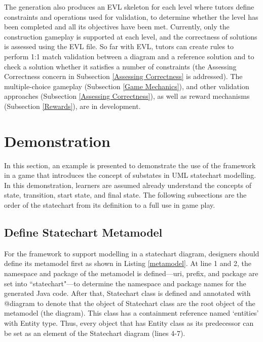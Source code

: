 \documentclass[conference]{IEEEtran}
\begin{document}
The generation also produces an EVL \cite{kolovos2006eclipse} skeleton for each level where tutors define constraints and operations used for validation, to determine whether the level has been completed and all its objectives have been met. Currently, only the construction gameplay is supported at each level, and the correctness of solutions is assessed using the EVL file. So far with EVL, tutors can create rules to perform 1:1 match validation between a diagram and a reference solution and to check a solution whether it satisfies a number of constraints (the Assessing Correctness concern in Subsection \ref{Assessing Correctness} is addressed). The multiple-choice gameplay (Subsection \ref{Game Mechanics}), and other validation approaches (Subsection \ref{Assessing Correctness}), as well as reward mechanisms (Subsection \ref{Rewards}), are in development. 


\section{Demonstration}
\label{Demonstration}
In this section, an example is presented to demonstrate the use of the framework in a game that introduces the concept of substates in UML statechart modelling. In this demonstration, learners are assumed already understand the concepts of state, transition, start state, and final state. The following subsections are the order of the statechart from its definition to a full use in game play.
 
\subsection{Define Statechart Metamodel}
For the framework to support modelling in a statechart diagram, designers should define its metamodel first as shown in Listing \ref{metamodel}. 
At line 1 and 2, the namespace and package of the metamodel is defined---uri, prefix, and package are set into ``statechart"---to determine the namespace and package names for the generated Java code. After that, Statechart class is defined and annotated with {\selectfont @diagram} to denote that the object of Statechart class are the root object of the metamodel (the diagram). This class has a containment reference named `entities' with Entity type. Thus, every object that has Entity class as its predecessor can be set as an element of the Statechart diagram (lines 4-7).  
\end{document}
